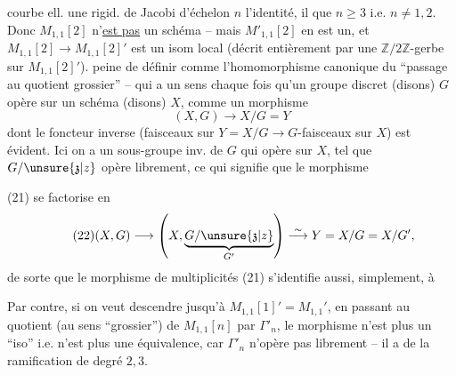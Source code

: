 courbe ell.  une rigid. de Jacobi d'échelon $n$  l'identité, il  que $n\geq 3$ i.e. $n\neq 1,2$. Donc $M_{1,1}[2]$ n'\uline{est pas} un schéma -- mais $M'_{1,1}[2]$ en est un, et $M_{1,1}[2]\to M_{1,1}[2]'$ est un  isom local (décrit entièrement par une $\mathbb Z/2\mathbb Z$-gerbe sur $M_{1,1}[2]'$).   peine de définir
comme l'homomorphisme canonique du ``passage au quotient grossier'' -- qui a un sens chaque fois qu'un groupe discret (disons)\unsure{\S} $G$ opère sur un schéma (disons) $X$, comme un morphisme
\[
\tag{21}
(X,G)\longrightarrow X/G=Y
\]
dont le foncteur  inverse (faisceaux sur $Y=X/G\longrightarrow G$-faisceaux sur $X$) est évident. Ici on a un sous-groupe inv.  de $G$ qui opère  sur $X$, tel que $G/\unsure{\mathfrak z|z}$ opère librement, ce qui signifie que le morphisme


(21) se factorise en
\[
\tag{22}
(X,G)\longrightarrow
\left(X,\underbrace{G/\unsure{\mathfrak z|z}}_{G'}\right)
\overset{\sim}{\longrightarrow}Y=X/G=X/G',
\]
de sorte que le morphisme de multiplicités (21) s'identifie aussi, simplement, à

Par contre, si on veut descendre jusqu'à $M_{1,1}[1]'=M_{1,1}'$, en passant au quotient (au sens ``grossier'') de $M_{1,1}[n]$ par $\Gamma'_n$, le morphisme
n'est plus un ``iso'' i.e. n'est plus une équivalence, car $\Gamma'_n$ n'opère pas librement -- il a  de la ramification de degré $2,3$.

